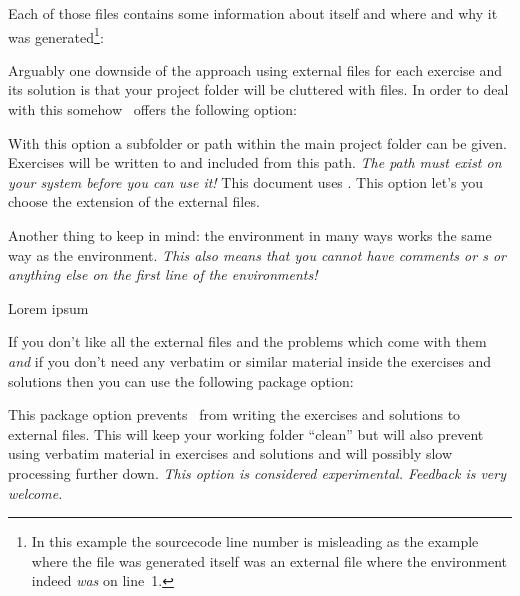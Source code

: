 \documentclass{xsim-manual}
\begin{document}
Each of those files contains some information about itself and where and why
it was generated\footnote{In this example the sourcecode line number is
  misleading as the example where the file was generated itself was an
  external file where the  environment indeed \emph{was} on
  line~1.}:


Arguably one downside of the approach using external files for each exercise
and its solution is that your project folder will be cluttered with files.  In
order to deal with this somehow \xsim\ offers the following option:
\begin{options}
  \Default
    With this option a subfolder or path within the main project folder can be
    given.  Exercises will be written to and included from this path.
    \emph{The path must exist on your system before you can use it!} This
    document uses .
    This option let's you choose the extension of the
    external files.
\end{options}

\begin{bewareofthedog}
  Another thing to keep in mind: the environment in many ways works the same
  way as the  environment. \emph{This also means that you
    \emph{cannot} have comments or s or anything else on the first
    line of the environments!}
\end{bewareofthedog}
\begin{sourcecode}
  \begin{exercise}[points=2] %
    Lorem ipsum
  \end{exercise}
\end{sourcecode}

If you don't like all the external files and the problems
which come with them \emph{and} if you don't need any verbatim or similar
material inside the exercises and solutions then you can use the following
package option:
\begin{options}
    This package option prevents \xsim\ from writing the exercises and
    solutions to external files.  This will keep your working folder ``clean''
    but will also prevent using verbatim material in exercises and solutions
    and will possibly slow processing further down.  \emph{This option is
      considered experimental.  Feedback is very welcome.}
\end{options}
\end{document}
